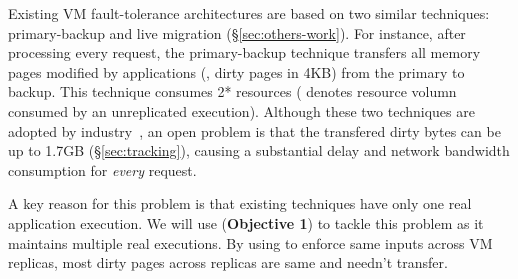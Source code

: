 
Existing VM fault-tolerance architectures are based on two similar 
techniques: primary-backup and live migration (\S\ref{sec:others-work}). For 
instance, after processing every request, the primary-backup technique 
transfers all memory pages modified by applications (\ie, dirty pages in 4KB) 
from the primary to backup. This technique consumes 2* resources ( 
denotes resource volumn consumed by an unreplicated execution). Although 
these two techniques are adopted by industry~\cite{ftvm}, an open problem is 
that the transfered dirty bytes can be up to 1.7GB (\S\ref{sec:tracking}), 
causing a substantial  delay and network bandwidth consumption for \emph{every} 
request.

A key reason for this problem is that existing techniques have only one real 
application execution. We will use \falcon (\textbf{Objective 1}) to tackle 
this problem as it maintains multiple real executions. By using \falcon to 
enforce same inputs across VM replicas, most dirty pages across replicas are 
same and needn't transfer.







% 


